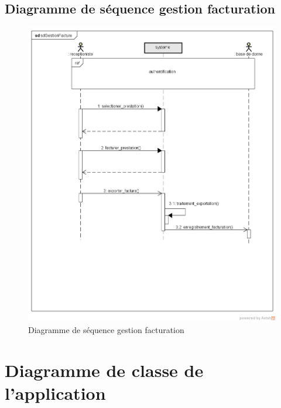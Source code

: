 	  \subsection{Diagramme de séquence gestion facturation}
	   \begin{figure}[h]
	  	  \includegraphics[scale=0.6]{Chapitre2/images/sd_gererfacture}
	  \caption{Diagramme de  séquence gestion facturation}
	  	  \end{figure}
	  
	  
	 
	
	  	  
	  \section{Diagramme de classe de l'application}
	  
